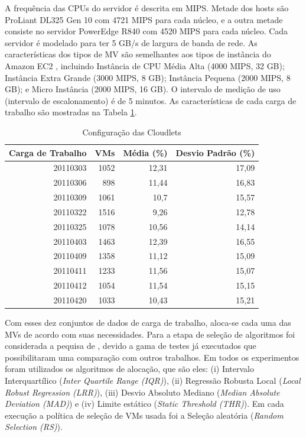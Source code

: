 \documentclass[tcc,capa]{texufpel}
\begin{document}
A frequência das CPUs do servidor é descrita em MIPS. Metade dos hosts são ProLiant DL325 Gen 10 com 4721 MIPS para cada núcleo, e a outra metade consiste no servidor PowerEdge R840 com 4520 MIPS para cada núcleo. Cada servidor é modelado para ter 5 GB/s de largura de banda de rede. 
As características dos tipos de MV são semelhantes aos tipos de instância do Amazon EC2 \cite{amazon2015amazon}, incluindo Instância de CPU Média Alta (4000 MIPS, 32 GB); Instância Extra Grande (3000 MIPS, 8 GB); Instância Pequena (2000 MIPS, 8 GB); e Micro Instância (2000 MIPS, 16 GB). 
O intervalo de medição de uso (intervalo de escalonamento) é de 5 minutos. As características de cada carga de trabalho são mostradas na Tabela \ref{lblConfCloudlets}. %

\begin{table}[htbp]
\begin{center}
\begin{tabular}{|r||r|r|r|} \hline
\textbf{Carga de Trabalho} &  \textbf{VMs} & \textbf{Média} (\%) & \textbf{Desvio Padrão} (\%) \\ \hline 
20110303 & 1052 & 12,31 & 17,09 \\ \hline
20110306 & 898 & 11,44 & 16,83 \\ \hline
20110309 & 1061 & 10,7 & 15,57 \\ \hline
20110322 & 1516 & 9,26 & 12,78 \\ \hline
20110325 & 1078 & 10,56 & 14,14 \\ \hline
20110403 & 1463 & 12,39 & 16,55 \\ \hline
20110409 & 1358 & 11,12 & 15,09 \\ \hline
20110411 & 1233 & 11,56 & 15,07 \\ \hline
20110412 & 1054 & 11,54 & 15,15 \\ \hline
20110420 & 1033 & 10,43 & 15,21 \\ \hline
\end{tabular}
\end{center}
\caption{Configuração das Cloudlets}
\label{lblConfCloudlets}
\end{table}

\newpage

Com esses dez conjuntos de dados de carga de trabalho, aloca-se cada uma das MVs de acordo com suas necessidades. Para a etapa de seleção de algoritmos foi considerada a pequisa de \cite{beloglazov2012optimal}, devido a gama de testes já executados que possibilitaram uma comparação com outros trabalhos. 
Em todos os experimentos foram utilizados os algoritmos de alocação, que são eles: (i) Intervalo Interquartílico (\emph{\textit{Inter Quartile Range} (IQR)}), (ii) Regressão Robusta Local (\emph{\textit{Local Robust Regression} (LRR)}), (iii) Desvio Absoluto Mediano (\emph{\textit{Median Absolute Deviation} (MAD)}) e (iv) Limite estático (\emph{\textit{Static Threshold} (THR)}). 
Em cada execução a política de seleção de VMs usada foi a Seleção aleatória (\emph{\textit{Random Selection} (RS)}).
\end{document}
